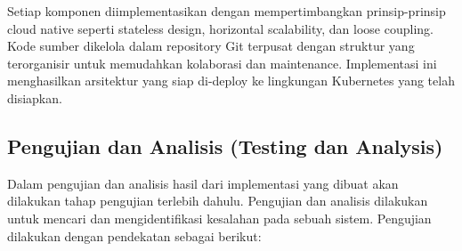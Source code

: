 Setiap komponen diimplementasikan dengan mempertimbangkan prinsip-prinsip cloud
native seperti stateless design, horizontal scalability, dan loose coupling.
Kode sumber dikelola dalam repository Git terpusat dengan struktur yang
terorganisir untuk memudahkan kolaborasi dan maintenance. Implementasi ini
menghasilkan arsitektur yang siap di-deploy ke lingkungan Kubernetes yang telah
disiapkan.

\subsection{Pengujian dan Analisis (Testing dan Analysis)}
Dalam pengujian dan analisis hasil dari implementasi yang dibuat akan dilakukan
tahap pengujian terlebih dahulu. Pengujian dan analisis dilakukan untuk mencari
dan mengidentifikasi kesalahan pada sebuah sistem. Pengujian dilakukan dengan
pendekatan sebagai berikut:

